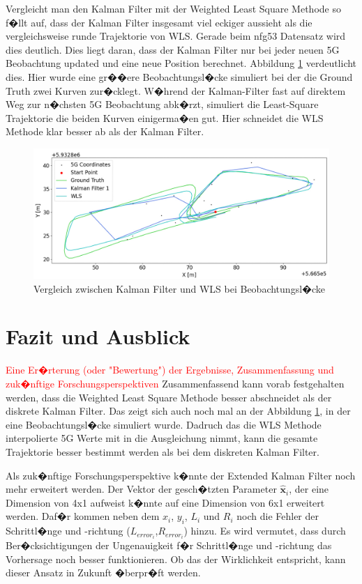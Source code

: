 Vergleicht man den Kalman Filter mit der Weighted Least Square Methode so f�llt auf, dass der Kalman Filter insgesamt viel eckiger aussieht als die vergleichsweise runde Trajektorie von WLS. Gerade beim nfg53 Datensatz wird dies deutlich. Dies liegt daran, dass der Kalman Filter nur bei jeder neuen 5G Beobachtung updated und eine neue Position berechnet. Abbildung \ref{fig:vergleich_1} verdeutlicht dies. Hier wurde eine gr��ere Beobachtungsl�cke simuliert bei der die Ground Truth zwei Kurven zur�cklegt. W�hrend der Kalman-Filter fast auf direktem Weg zur n�chsten 5G Beobachtung abk�rzt, simuliert die Least-Square Trajektorie die beiden Kurven einigerma�en gut. Hier schneidet die WLS Methode klar besser ab als der Kalman Filter.
\begin{figure}[h!]
	\centering
	\includegraphics[width=0.8\linewidth]{source/images/vergleich_ls_kf_gap}
	\caption{Vergleich zwischen Kalman Filter und WLS bei Beobachtungsl�cke}
	\label{fig:vergleich_1}
\end{figure}


\section{Fazit und Ausblick}
\textcolor{red}{Eine Er�rterung (oder "Bewertung") der Ergebnisse, Zusammenfassung und zuk�nftige Forschungsperspektiven
}
Zusammenfassend kann vorab festgehalten werden, dass die Weighted Least Square Methode besser abschneidet als der diskrete Kalman Filter. Das zeigt sich auch noch mal an der Abbildung \ref{fig:vergleich_1}, in der eine Beobachtungsl�cke simuliert wurde. Dadruch das die WLS Methode interpolierte 5G Werte mit in die Ausgleichung nimmt, kann die gesamte Trajektorie besser bestimmt werden als bei dem diskreten Kalman Filter. 

Als zuk�nftige Forschungsperspektive k�nnte der Extended Kalman Filter noch mehr erweitert werden. Der Vektor der gesch�tzten Parameter $\boldsymbol{\hat{x}}_{i}$, der eine Dimension von 4x1 aufweist k�nnte auf eine Dimension von 6x1 erweitert werden. Daf�r kommen neben dem ${x}_{i}$, ${y}_{i}$, ${L}_{i}$ und ${R}_{i}$ noch die Fehler der Schrittl�nge und -richtung ($L_{error_i}$,$R_{error_i}$) hinzu. Es wird vermutet, dass durch Ber�cksichtigungen der Ungenauigkeit f�r Schrittl�nge und -richtung das Vorhersage noch besser funktionieren. Ob das der Wirklichkeit entspricht, kann dieser Ansatz in Zukunft �berpr�ft werden. 

%